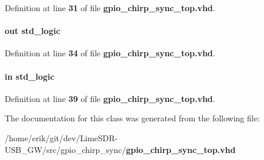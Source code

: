 Definition at line {\bf 31} of file {\bf gpio\+\_\+chirp\+\_\+sync\+\_\+top.\+vhd}.

\paragraph[{T\+E\+S\+T\+O\+UT}]{ {\bfseries \textcolor{keywordflow}{out}\textcolor{vhdlchar}{ }} {\bfseries \textcolor{comment}{std\+\_\+logic}\textcolor{vhdlchar}{ }} \hspace{0.3cm}{\ttfamily [Port]}}\label{classgpio__chirp__sync__top_ae280229a7f09fad9db61082c7d6a7844}


Definition at line {\bf 34} of file {\bf gpio\+\_\+chirp\+\_\+sync\+\_\+top.\+vhd}.

\paragraph[{trxiqpulse}]{ {\bfseries \textcolor{keywordflow}{in}\textcolor{vhdlchar}{ }} {\bfseries \textcolor{comment}{std\+\_\+logic}\textcolor{vhdlchar}{ }} \hspace{0.3cm}{\ttfamily [Port]}}\label{classgpio__chirp__sync__top_a808d6d382f3c6a02784a160f67d0f891}


Definition at line {\bf 39} of file {\bf gpio\+\_\+chirp\+\_\+sync\+\_\+top.\+vhd}.



The documentation for this class was generated from the following file\+:\begin{DoxyCompactItemize}
\item 
/home/erik/git/dev/\+Lime\+S\+D\+R-\/\+U\+S\+B\+\_\+\+G\+W/src/gpio\+\_\+chirp\+\_\+sync/{\bf gpio\+\_\+chirp\+\_\+sync\+\_\+top.\+vhd}\end{DoxyCompactItemize}

